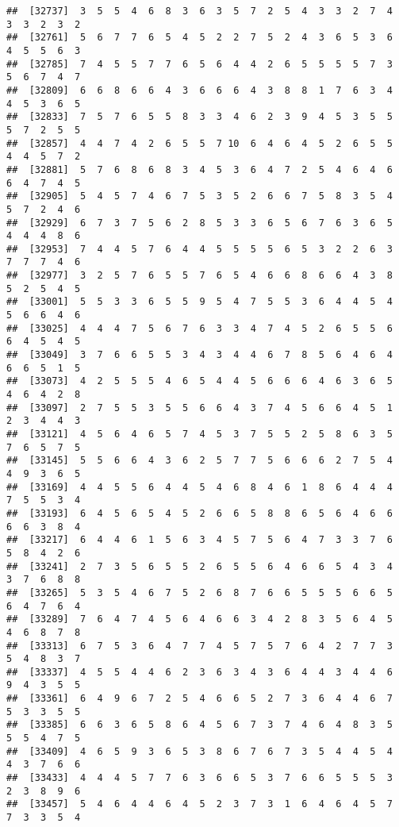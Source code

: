 \documentclass[
]{book}
\begin{document}
\begin{verbatim}
##  [32737]  3  5  5  4  6  8  3  6  3  5  7  2  5  4  3  3  2  7  4  3  3  2  3  2
##  [32761]  5  6  7  7  6  5  4  5  2  2  7  5  2  4  3  6  5  3  6  4  5  5  6  3
##  [32785]  7  4  5  5  7  7  6  5  6  4  4  2  6  5  5  5  5  7  3  5  6  7  4  7
##  [32809]  6  6  8  6  6  4  3  6  6  6  4  3  8  8  1  7  6  3  4  4  5  3  6  5
##  [32833]  7  5  7  6  5  5  8  3  3  4  6  2  3  9  4  5  3  5  5  5  7  2  5  5
##  [32857]  4  4  7  4  2  6  5  5  7 10  6  4  6  4  5  2  6  5  5  4  4  5  7  2
##  [32881]  5  7  6  8  6  8  3  4  5  3  6  4  7  2  5  4  6  4  6  6  4  7  4  5
##  [32905]  5  4  5  7  4  6  7  5  3  5  2  6  6  7  5  8  3  5  4  5  7  2  4  6
##  [32929]  6  7  3  7  5  6  2  8  5  3  3  6  5  6  7  6  3  6  5  4  4  4  8  6
##  [32953]  7  4  4  5  7  6  4  4  5  5  5  5  6  5  3  2  2  6  3  7  7  7  4  6
##  [32977]  3  2  5  7  6  5  5  7  6  5  4  6  6  8  6  6  4  3  8  5  2  5  4  5
##  [33001]  5  5  3  3  6  5  5  9  5  4  7  5  5  3  6  4  4  5  4  5  6  6  4  6
##  [33025]  4  4  4  7  5  6  7  6  3  3  4  7  4  5  2  6  5  5  6  6  4  5  4  5
##  [33049]  3  7  6  6  5  5  3  4  3  4  4  6  7  8  5  6  4  6  4  6  6  5  1  5
##  [33073]  4  2  5  5  5  4  6  5  4  4  5  6  6  6  4  6  3  6  5  4  6  4  2  8
##  [33097]  2  7  5  5  3  5  5  6  6  4  3  7  4  5  6  6  4  5  1  2  3  4  4  3
##  [33121]  4  5  6  4  6  5  7  4  5  3  7  5  5  2  5  8  6  3  5  7  6  5  7  5
##  [33145]  5  5  6  6  4  3  6  2  5  7  7  5  6  6  6  2  7  5  4  4  9  3  6  5
##  [33169]  4  4  5  5  6  4  4  5  4  6  8  4  6  1  8  6  4  4  4  7  5  5  3  4
##  [33193]  6  4  5  6  5  4  5  2  6  6  5  8  8  6  5  6  4  6  6  6  6  3  8  4
##  [33217]  6  4  4  6  1  5  6  3  4  5  7  5  6  4  7  3  3  7  6  5  8  4  2  6
##  [33241]  2  7  3  5  6  5  5  2  6  5  5  6  4  6  6  5  4  3  4  3  7  6  8  8
##  [33265]  5  3  5  4  6  7  5  2  6  8  7  6  6  5  5  5  6  6  5  6  4  7  6  4
##  [33289]  7  6  4  7  4  5  6  4  6  6  3  4  2  8  3  5  6  4  5  4  6  8  7  8
##  [33313]  6  7  5  3  6  4  7  7  4  5  7  5  7  6  4  2  7  7  3  5  4  8  3  7
##  [33337]  4  5  5  4  4  6  2  3  6  3  4  3  6  4  4  3  4  4  6  9  4  3  5  5
##  [33361]  6  4  9  6  7  2  5  4  6  6  5  2  7  3  6  4  4  6  7  5  3  3  5  5
##  [33385]  6  6  3  6  5  8  6  4  5  6  7  3  7  4  6  4  8  3  5  5  5  4  7  5
##  [33409]  4  6  5  9  3  6  5  3  8  6  7  6  7  3  5  4  4  5  4  4  3  7  6  6
##  [33433]  4  4  4  5  7  7  6  3  6  6  5  3  7  6  6  5  5  5  3  2  3  8  9  6
##  [33457]  5  4  6  4  4  6  4  5  2  3  7  3  1  6  4  6  4  5  7  7  3  3  5  4

\end{verbatim}
\end{document}
